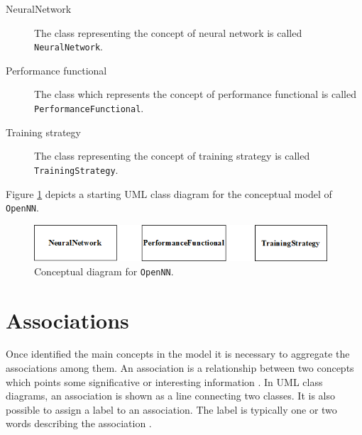 \begin{description}

\item[NeuralNetwork] 

The class representing the concept of neural network is called \lstinline"NeuralNetwork".

\item[Performance functional]

The class which represents the concept of performance functional is called \lstinline"PerformanceFunctional".

\item[Training strategy]

The class representing the concept of training strategy is called \lstinline"TrainingStrategy".

\end{description}

Figure \ref{ConceptDiagram} depicts a starting UML class diagram
for the conceptual model of \texttt{OpenNN}.

\begin{figure}[h!]
\begin{center}
\includegraphics[width=0.975\textwidth]{software_model_basis/concept_diagram}
\caption{Conceptual diagram for \texttt{OpenNN}.}\label{ConceptDiagram}
\end{center}
\end{figure}


\section{Associations}


Once identified the main concepts in the model it is necessary to
aggregate the associations among them. An association is a
relationship between two concepts which points some significative
or interesting information \cite{Stroustrup2000}. In UML class
diagrams, an association is shown as a line connecting two
classes. It is also possible to assign a label to an association.
The label is typically one or two words describing the association
\cite{Rumbaugh1999}.


